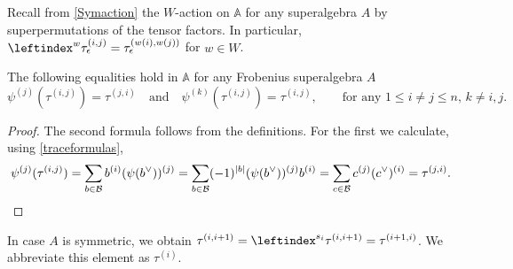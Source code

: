 \documentclass[a4paper,11pt]{amsart}
\newcommand\cB{\mathcal{B}}
\numberwithin{equation}{subsection}
\theoremstyle{definition}
\theoremstyle{theorem}
\theoremstyle{remark}
\newcommand\Sym{W}
\newcommand\taui[1][i]{\tau^{(#1)}}
\newcommand{\Ao}{\mathbb{A}}
\begin{document}
Recall from \autoref{Symaction} the $\Sym$-action on  $\Ao$ for any superalgebra $A$ by superpermutations of the tensor factors. In particular, $\leftindex^w\tau^{(i,j)}_\epsilon=\tau^{(w(i),w(j))}_\epsilon$ for $w\in\Sym$.
 \begin{Lemma} \label{psitauA} The following equalities hold in $\Ao$ for any Frobenius superalgebra $A$
    \begin{equation*}
 \psi^{(j)}(\tau^{(i,j)})=\tau^{(j,i)}\quad\text{and}\quad \psi^{(k)}(\tau^{(i,j)})=\tau^{(i,j)}, \quad\quad\text{for any $1\leq i\not=j\leq n$, $k\not=i,j$.}
   \end{equation*}
  \end{Lemma}
  \begin{proof}
 The second formula follows from the definitions. For the first we calculate, using \autoref{traceformulas},
 \begin{equation*}
 \psi^{(j)}(\taui[i,j])=\sum_{b\in\cB}b^{(i)}(\psi(b^\vee))^{(j)}=\sum_{b\in\cB}(-1)^{|b|}(\psi(b^\vee))^{(j)}b^{(i)}=
 \sum_{c\in\cB}c^{(j)}(c^\vee)^{(i)}=\tau^{(j,i)}. \qedhere
 \end{equation*}
  \end{proof}
  In case $A$ is symmetric, we obtain $\tau^{(i,i+1)}=\leftindex^{s_i}\tau^{(i,i+1)}=\tau^{(i+1,i)}$.
  We abbreviate this element as $\tau^{(i)}$.
\end{document}
